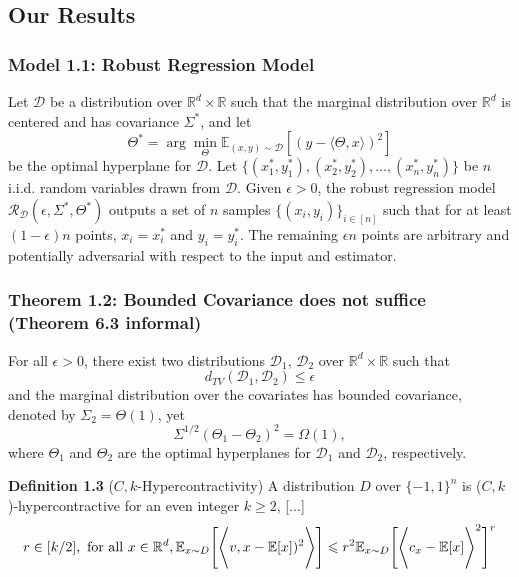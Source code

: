 \documentclass[preprint,11pt]{elsarticle}
\begin{document}
\subsection{Our Results}

\subsubsection{Model 1.1: Robust Regression Model}

Let $\mathcal{D}$ be a distribution over $\mathbb{R}^d \times \mathbb{R}$ such that the marginal distribution over $\mathbb{R}^d$ is centered and has covariance $\Sigma^\ast$, and let
\[
\Theta^\ast = \arg\min_{\Theta} \mathbb{E}_{(x,y) \sim \mathcal{D}} \left[ (y - \langle \Theta, x \rangle)^2 \right]
\]
be the optimal hyperplane for $\mathcal{D}$. Let $\{(x^\ast_1, y^\ast_1), (x^\ast_2, y^\ast_2), \dots, (x^\ast_n, y^\ast_n)\}$ be $n$ i.i.d. random variables drawn from $\mathcal{D}$. Given $\epsilon > 0$, the robust regression model $\mathcal{R}_{\mathcal{D}} (\epsilon, \Sigma^\ast, \Theta^\ast)$ outputs a set of $n$ samples $\{(x_i, y_i)\}_{i \in [n]}$ such that for at least $(1 - \epsilon)n$ points, $x_i = x^\ast_i$ and $y_i = y^\ast_i$. The remaining $\epsilon n$ points are arbitrary and potentially adversarial with respect to the input and estimator.

\subsubsection{Theorem 1.2: Bounded Covariance does not suffice (Theorem 6.3 informal)}

For all $\epsilon > 0$, there exist two distributions $\mathcal{D}_1$, $\mathcal{D}_2$ over $\mathbb{R}^d \times \mathbb{R}$ such that
\[
d_{TV} (\mathcal{D}_1, \mathcal{D}_2) \leq \epsilon
\]
and the marginal distribution over the covariates has bounded covariance, denoted by $\Sigma_2 = \Theta(1)$, yet
\[
\Sigma^{1/2} (\Theta_1 - \Theta_2)^2 = \Omega(1),
\]
where $\Theta_1$ and $\Theta_2$ are the optimal hyperplanes for $\mathcal{D}_1$ and $\mathcal{D}_2$, respectively.




\textbf{Definition 1.3} ($\mathcal{}{C,k}$-Hypercontractivity) A distribution \( D \)  over \( \{ -1, 1 \}^n \) is ($\mathcal{}{C,k}$)-hypercontractive for an even integer \( k \geq 2 \), [...]
\begin{equation}
r \in [k/2], \text{ for all } x \in \mathbb{R}^d,\hfill\break
\mathbb{E}_{x\sim D} \Biggr[ \Biggl \langle   v,x - \mathbb{E}[x])^2 \Biggr \rangle \Biggr]\leqslant r^2
\mathbb{E}_{x\sim D} \Biggr[ \Biggl \langle c_x - \mathbb{E}[x] \Biggr \rangle^2\Biggr]^{r}
\end{equation}
\end{document}
